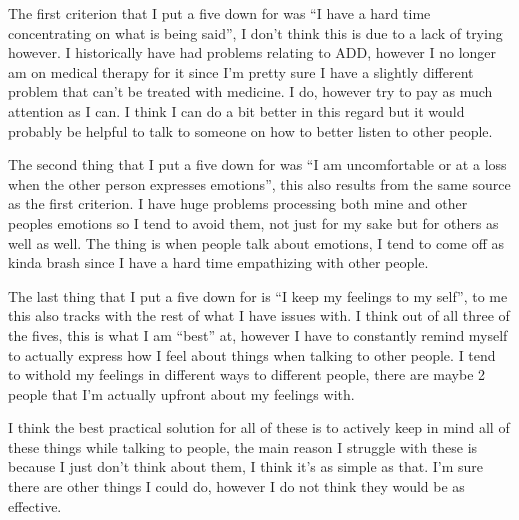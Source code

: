 \documentclass[12pt]{article}
\begin{document}
\begin{doublespace}
\vspace*{20pt}
 
    \par %
    The first criterion that I put a five down for was ``I have a hard time concentrating on what is being said'', I don't think this is due to a lack of trying however. I historically have had problems relating to ADD, however I no longer am on medical therapy for it since I'm pretty sure I have a slightly different problem that can't be treated with medicine. I do, however try to pay as much attention as I can. I think I can do a bit better in this regard but it would probably be helpful to talk to someone on how to better listen to other people.
    \par %
    The second thing that I put a five down for was ``I am uncomfortable or at a loss when the other person expresses emotions'', this also results from the same source as the first criterion. I have huge problems processing both mine and other peoples emotions so I tend to avoid them, not just for my sake but for others as well as well. The thing is when people talk about emotions, I tend to come off as kinda brash since I have a hard time empathizing with other people.
    \par %
    The last thing that I put a five down for is ``I keep my feelings to my self'', to me this also tracks with the rest of what I have issues with. I think out of all three of the fives, this is what I am ``best'' at, however I have to constantly remind myself to actually express how I feel about things when talking to other people. I tend to withold my feelings in different ways to different people, there are maybe 2 people that I'm actually upfront about my feelings with.
    \par %
    I think the best practical solution for all of these is to actively keep in mind all of these things while talking to people, the main reason I struggle with these is because I just don't think about them, I think it's as simple as that. I'm sure there are other things I could do, however I do not think they would be as effective.
\end{doublespace}
\end{document}
